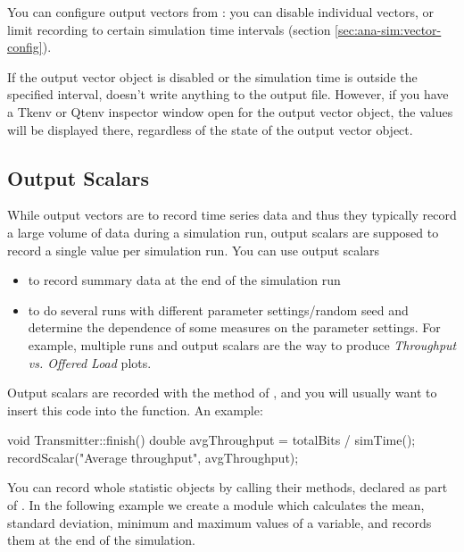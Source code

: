 You can configure output vectors from :
you can disable individual vectors, or limit recording to certain
simulation time intervals (section \ref{sec:ana-sim:vector-config}).

If the output vector object is disabled or the simulation time is
outside the specified interval,  doesn't write
anything to the output file. However, if you have a Tkenv or Qtenv inspector
window open for the output vector object,
the values will be displayed there, regardless of the state of the
output vector object.



\subsection{Output Scalars}

While output vectors are to record time series data and thus they
typically record a large volume of data during a simulation run,
output scalars are supposed to record a single
value per simulation run. You can use output scalars

\begin{itemize}
\item{to record summary data at the end of the simulation run}
\item{to do several runs with different parameter settings/random seed
    and determine the dependence of some measures on the parameter
    settings. For example, multiple runs and output scalars are the
    way to produce \textit{Throughput vs. Offered Load} plots.}
\end{itemize}

Output scalars are recorded with the  method of
, and you will usually want to insert this code
into the  function. An example:

\begin{cpp}
void Transmitter::finish()
{
    double avgThroughput = totalBits / simTime();
    recordScalar("Average throughput", avgThroughput);
}
\end{cpp}

You can record whole statistic objects by calling their 
methods, declared as part of . In the following example
we create a  module which calculates the mean, standard
deviation, minimum and maximum values of a variable, and records them at the
end of the simulation.

